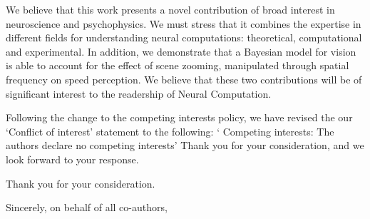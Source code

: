 \documentclass[stdletter,8pt,dateno]{newlfm}%
\newcommand{\Journal}{Neural Computation}%
\begin{document}
\begin{newlfm}
We believe that this work presents a novel contribution of broad interest in neuroscience and psychophysics. We must stress that it combines the expertise in different fields for understanding neural computations: theoretical, computational and experimental. In addition, we demonstrate that a Bayesian model for vision is able to account for the effect of scene zooming, manipulated through spatial frequency on speed perception. We believe that these two contributions will be of significant interest to the readership of \Journal.


Following the change to the competing interests policy, we have revised the our ‘Conflict of interest’ statement to the following: 
‘
Competing interests: The authors declare no competing interests’
Thank you for your consideration, and we look forward to your response. 


Thank you for your consideration.%


Sincerely, on behalf of all co-authors, 

\end{newlfm}
\end{document}
